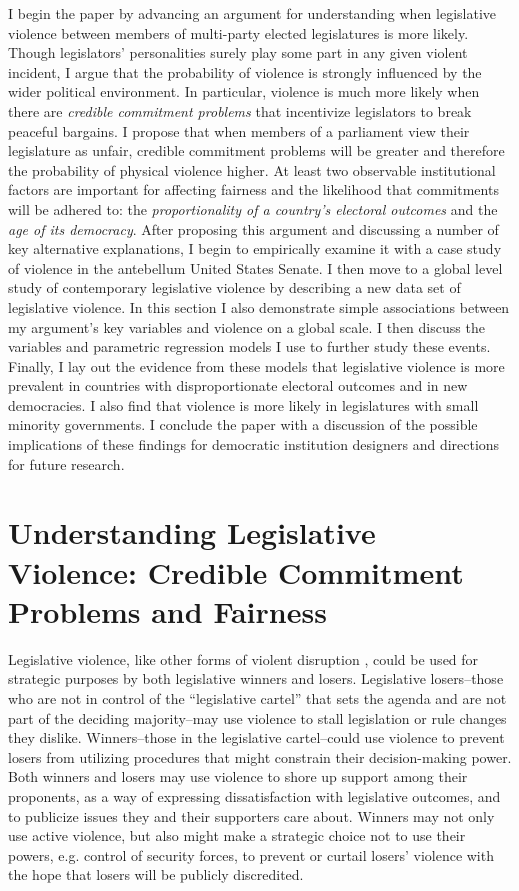 \documentclass[a4paper]{article}\usepackage[]{graphicx}\usepackage[]{color}
\begin{document}
I begin the paper by advancing an argument for understanding when legislative violence between members of multi-party elected legislatures is more likely. Though legislators' personalities surely play some part in any given violent incident, I argue that the probability of violence is strongly influenced by the wider political environment. In particular, violence is much more likely when there are \emph{credible commitment problems} that incentivize legislators to break peaceful bargains. I propose that when members of a parliament view their legislature as unfair, credible commitment problems will be greater and therefore the probability of physical violence higher. At least two observable institutional factors are important for affecting fairness and the likelihood that commitments will be adhered to: the \emph{proportionality of a country's electoral outcomes} and the \emph{age of its democracy}. After proposing this argument and discussing a number of key alternative explanations, I begin to empirically examine it with a case study of violence in the antebellum United States Senate. I then move to a global level study of contemporary legislative violence by describing a new data set of legislative violence. In this section I also demonstrate simple associations between my argument's key variables and violence on a global scale. I then discuss the variables and parametric regression models I use to further study these events. Finally, I lay out the evidence from these models that legislative violence is more prevalent in countries with disproportionate electoral outcomes and in new democracies. I also find that violence is more likely in legislatures with small minority governments. I conclude the paper with a discussion of the possible implications of these findings for democratic institution designers and directions for future research.


\section{Understanding Legislative Violence: Credible Commitment Problems and Fairness}

Legislative violence, like other forms of violent disruption \citep[see][]{Beaulieu2008,BeaulieuForthcoming,wilkinson2006}, could be used for strategic purposes by both legislative winners and losers. Legislative losers--those who are not in control of the ``legislative cartel''  that sets the agenda \citep{cox2007} and are not part of the deciding majority--may use violence to stall legislation or rule changes they dislike. Winners--those in the legislative cartel--could use violence to prevent losers from utilizing procedures that might constrain their decision-making power. Both winners and losers may use violence to shore up support among their proponents, as a way of expressing dissatisfaction with legislative outcomes, and to publicize issues they and their supporters care about. Winners may not only use active violence, but also might make a strategic choice not to use their powers, e.g. control of security forces, to prevent or curtail losers' violence with the hope that losers will be publicly discredited.
\end{document}
